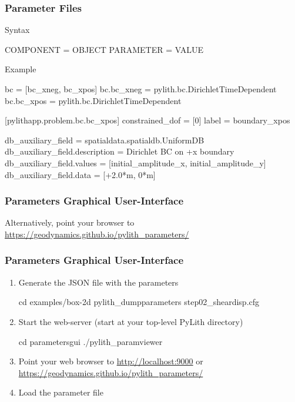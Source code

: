 \documentclass[aspectratio=169]{beamer}
\begin{document}
\begin{frame}[fragile]
  \frametitle{Parameter Files}

  Syntax
  \begin{cfgcode}
    COMPONENT = OBJECT
    PARAMETER = VALUE
  \end{cfgcode}

  Example
  \begin{cfgcode}
      bc = [bc_xneg, bc_xpos]
      bc.bc_xneg = pylith.bc.DirichletTimeDependent
      bc.bc_xpos = pylith.bc.DirichletTimeDependent

      [pylithapp.problem.bc.bc_xpos]
      constrained_dof = [0]
      label = boundary_xpos

      db_auxiliary_field = spatialdata.spatialdb.UniformDB
      db_auxiliary_field.description = Dirichlet BC on +x boundary
      db_auxiliary_field.values = [initial_amplitude_x, initial_amplitude_y]
      db_auxiliary_field.data = [+2.0*m, 0*m]
    \end{cfgcode}

\end{frame}


\begin{frame}
  \frametitle{Parameters Graphical User-Interface}

  Alternatively, point your browser to \url{https://geodynamics.github.io/pylith_parameters/}\\
  

\end{frame}

\begin{frame}[fragile]
  \frametitle{Parameters Graphical User-Interface}

  \begin{enumerate}
  \item Generate the JSON file with the parameters
    \begin{bashcode}
      cd examples/box-2d
      pylith_dumpparameters step02_sheardisp.cfg
    \end{bashcode}
  \item Start the web-server (start at your top-level PyLith directory)
    \begin{bashcode}
      cd parametersgui
      ./pylith_paramviewer
    \end{bashcode}
  \item Point your web browser to \url{http://localhost:9000} or \url{https://geodynamics.github.io/pylith_parameters/}
  \item Load the parameter file
  \end{enumerate}

\end{frame}
\end{document}
